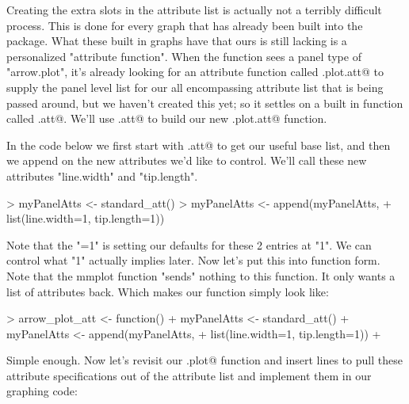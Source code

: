 \documentclass{article}
\begin{document}
Creating the extra slots in the attribute list is actually not a terribly difficult process. This is done for every graph that has already been built into the \verb@micromap@ package. What these built in graphs have that ours is still lacking is a personalized "attribute function". When the \verb@mmplot@ function sees a panel type of "arrow.plot", it's already looking for an attribute function called \verb@arrow.plot.att@ to supply the panel level list for our all encompassing attribute list that is being passed around, but we haven't created this yet; so it settles on a built in function called \verb@standard.att@. We'll use \verb@standard.att@ to build our new \verb@arrow.plot.att@ function.

In the code below we first start with \verb@standard.att@ to get our useful base list, and then we append on the new attributes we'd like to control. We'll call these new attributes "line.width" and "tip.length".

\begin{Schunk}
\begin{Sinput}
> myPanelAtts <- standard_att()
> myPanelAtts <- append(myPanelAtts,
+ list(line.width=1, tip.length=1))
\end{Sinput}
\end{Schunk}

Note that the "=1" is setting our defaults for these 2 entries at "1". We can control what "1" actually implies later. Now let's put this into function form. Note that the mmplot function "sends" nothing to this function. It only wants a
list of attributes back. Which makes our function simply look like:

\begin{Schunk}
\begin{Sinput}
> arrow_plot_att <- function(){
+   myPanelAtts <- standard_att()
+   myPanelAtts <- append(myPanelAtts,
+   list(line.width=1, tip.length=1))
+ }
\end{Sinput}
\end{Schunk}

Simple enough. Now let's revisit our \verb@arrow.plot@ function and insert lines to pull these attribute specifications out of the attribute list and implement them in our graphing code:
\end{document}

